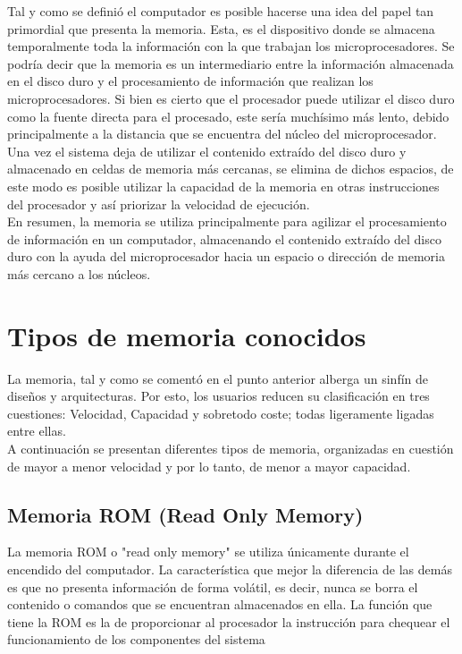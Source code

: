 \documentclass{article}
\begin{document}
Tal y como se definió el computador es posible hacerse una idea del papel tan primordial que presenta la memoria. Esta, es el dispositivo donde se almacena temporalmente toda la información con la que trabajan los microprocesadores. Se podría decir que la memoria es un intermediario entre la información almacenada en el disco duro y el procesamiento de información que realizan los microprocesadores. Si bien es cierto que el procesador puede utilizar el disco duro como la fuente directa para el procesado, este sería muchísimo más lento, debido principalmente a la distancia que se encuentra del núcleo del microprocesador.
Una vez el sistema deja de utilizar el contenido extraído del disco duro y almacenado en celdas de memoria más cercanas, se elimina de dichos espacios, de este modo es posible utilizar la capacidad de la memoria en otras instrucciones del procesador y así priorizar la velocidad de ejecución.\\

En resumen, la memoria se utiliza principalmente para agilizar el procesamiento de información en un computador, almacenando el contenido extraído del disco duro con la ayuda del microprocesador hacia un espacio o dirección de memoria más cercano a los núcleos.


\section{Tipos de memoria conocidos} \label{contenido}
La memoria, tal y como se comentó en el punto anterior alberga un sinfín de diseños y arquitecturas. Por esto, los usuarios reducen su clasificación en tres cuestiones: Velocidad, Capacidad y sobretodo coste; todas ligeramente ligadas entre ellas.\\

A continuación se presentan diferentes tipos de memoria, organizadas en cuestión de mayor a menor velocidad y por lo tanto, de menor a mayor capacidad.

\subsection{Memoria ROM (Read Only Memory)}

La memoria ROM o "read only memory" se utiliza únicamente durante el encendido del computador. La característica que mejor la diferencia de las demás es que no presenta información de forma volátil, es decir, nunca se borra el contenido o comandos que se encuentran almacenados en ella. La función que tiene la ROM es la de proporcionar al procesador la instrucción para chequear el funcionamiento de los componentes del sistema
\end{document}
